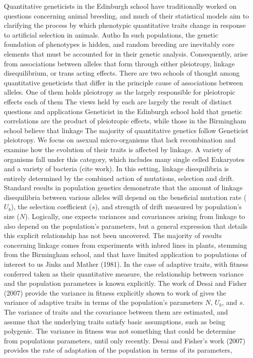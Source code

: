 \documentclass{article}
\begin{document}
Quantitative geneticists in the Edinburgh school have traditionally worked on questions concerning animal breeding, and much of their statistical models aim to clarifying the process by which phenotypic quantitative traits change in response to artificial selection in animals.  Autho
In such populations, the genetic foundation of phenotypes is hidden, and random breeding are inevitably core elements that must be accounted for in their genetic analysis.  Consequently, 
 arise from associations between alleles that form through either pleiotropy, linkage disequilibrium, or trans acting effects. 
There are two schools of thought among quantitative geneticists that differ in the principle cause of associations between alleles.  One of them holds pleiotropy as the largely responsible for  pleiotropic effects each of them The views held by each are largely the result of distinct questions and applications Geneticist in the Edinburgh school hold that genetic correlations are the product of pleiotropic effects, while those in the Birmingham school believe that linkage 
The majority of quantitative genetics follow  
Geneticist pleiotropy.
We focus on asexual micro-organisms that lack recombination and examine how the evolution of their traits is affected by linkage. A variety of organisms fall under this category, which includes many single celled Eukaryotes and a variety of bacteria (cite work). In this setting, linkage disequilibria is entirely determined by the combined action of mutations, selection and drift. Standard results in population genetics demonstrate that the amount of linkage disequilibria between various alleles will depend on the beneficial mutation rate ($U_b$), the selection coefficient ($s$), and strength of drift measured by population’s size ($N$). Logically, one expects variances and covariances arising from linkage to also depend on the population’s parameters, but a general expression that details this explicit relationship has not been uncovered. The majority of results concerning linkage comes from experiments with inbred lines in plants, stemming from the Birmingham school, and that have limited application to populations of interest to us Jinks and Mather (1981).
In the case of adaptive traits, with fitness conferred taken as their quantitative measure, the relationship between variance and the population parameters is known explicitly. The work of Desai and Fisher (2007) provide the variance in fitness explicitly shown to work of gives the variance of adaptive traits in terms of the population’s parameters $N$, $U_b$, and $s$. The variance of traits and the covariance between them are estimated, and assume that the underlying traits satisfy basic assumptions, such as being polygenic. The variance in fitness was not something that could be determine from populations parameters, until only recently. Desai and Fisher’s work (2007) provides the rate of adaptation of the population in terms of its parameters,
\end{document}
